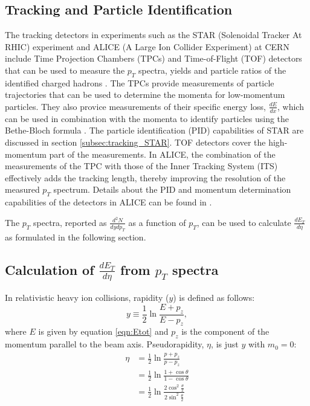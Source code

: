 \subsection{Tracking and Particle Identification}
The tracking detectors in experiments such as the STAR (Solenoidal Tracker At RHIC) experiment and ALICE (A Large Ion Collider Experiment) at CERN include Time Projection Chambers (TPCs) and Time-of-Flight (TOF) detectors that can be used to measure the $p_{T}$ spectra, yields and particle ratios of the identified charged hadrons \cite{Preghenella:2011vy, PhysRevC.96.044904}. The TPCs provide measurements of particle trajectories that can be used to determine the momenta for low-momentum particles. They also provice measurements of their specific energy loss, $\frac{dE}{dx}$, which can be used in combination with the momenta to identify particles using the Bethe-Bloch formula \cite{bethe1953passage}. The particle identification (PID) capabilities of STAR are discussed in section \ref{subsec:tracking_STAR}. TOF detectors cover the high-momentum part of the measurements. In ALICE, the combination of the measurements of the TPC with those of the Inner Tracking System (ITS) effectively adds the tracking length, thereby improving the resolution of the measured $p_{T}$ spectrum. Details about the PID and momentum determination capabilities of the detectors in ALICE can be found in \cite{1748-0221-3-08-S08002}.

The $p_{T}$ spectra, reported as $\frac{d^{2}N}{dydp_{T}}$ as a function of $p_{T}$, can be used to calculate $\frac{dE_{T}}{d\eta}$ as formulated in the following section.

\subsection{Calculation of $\frac{dE_{T}}{d\eta}$ from $p_{T}$ spectra}\label{section:calcFromSpectra}
In relativistic heavy ion collisions, rapidity ($y$) is defined as follows:
\begin{equation}\label{eqn:rapidity}
y\equiv\frac{1}{2}\ln{\frac{E + p_{z}}{E - p_{z}}},
\end{equation}
where $E$ is given by equation \ref{eqn:Etot} and $p_{z}$ is the component of the momentum parallel to the beam axis.
Pseudorapidity, $\eta$, is just $y$ with $m_{0} = 0$:
\begin{align*}\label{derivation:pseudorapidity}
\eta &= \frac{1}{2}\ln{\frac{p + p_{z}}{p - p_{z}}}\\
&= \frac{1}{2}\ln{\frac{1 + \cos{\theta}}{1 - \cos{\theta}}}\\
&= \frac{1}{2}\ln{\frac{2\cos^2{\frac{\theta}{2}}}{2\sin^2{\frac{\theta}{2}}}}
\end{align*}

